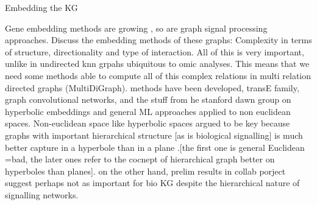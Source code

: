 
Embedding the KG

Gene embedding methods are growing , so are graph signal processing approaches. 
Discuss the embedding methods of these graphs:
Complexity in terms of structure, directionality and type of interaction. All of this is very important, unlike in undirected knn grpahs ubiquitous to omic analyses.
This means that we need some methods able to compute all of this complex relations in multi relation directed graphs  (MultiDiGraph). methods have been developed, transE \cite{bordes_translating_2013}family, graph convolutional networks, and the stuff from he stanford dawn group on  hyperbolic embeddings  \cite{chami_hyperbolic_2019} and general ML approaches applied to non euclidean spaces.
Non-euclidean space like hyperbolic spaces argued to be key because graphs with important hierarchical structure [as is biological signalling] is much better capture in a hyperbole than in a plane \cite{bronstein_geometric_2017,nickel_poincare_2017,chamberlain_neural_2017}.[the first one is general Euclidean =bad, the later ones refer to the cocnept of hierarchical graph better on hyperboles than planes].
on the other hand, prelim results in collab porject suggest perhaps not as important for bio KG despite the hierarchical nature of signalling networks.


% 

